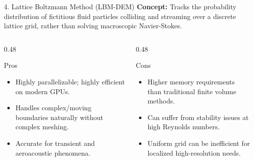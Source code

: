 \begin{frame}{4. Lattice Boltzmann Method (LBM-DEM)}
    \textbf{Concept:} Tracks the probability distribution of fictitious fluid particles colliding and streaming over a discrete lattice grid, rather than solving macroscopic Navier-Stokes.
    \vspace{0.3cm}
    
    \begin{columns}[T]
        \begin{column}{0.48\textwidth}
            \begin{block}{Pros}
                \begin{itemize}
                    \item Highly parallelizable; highly efficient on modern GPUs.
                    \item Handles complex/moving boundaries naturally without complex meshing.
                    \item Accurate for transient and aeroacoustic phenomena.
                \end{itemize}
            \end{block}
        \end{column}
        
        \begin{column}{0.48\textwidth}
            \begin{alertblock}{Cons}
                \begin{itemize}
                    \item Higher memory requirements than traditional finite volume methods.
                    \item Can suffer from stability issues at high Reynolds numbers.
                    \item Uniform grid can be inefficient for localized high-resolution needs.
                \end{itemize}
            \end{alertblock}
        \end{column}
    \end{columns}
\end{frame}


